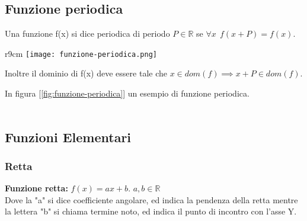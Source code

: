 \subsection{Funzione periodica}
\begin{definition}[Periodicità]
    Una funzione f(x) si dice periodica di periodo $P \in \mathbb{R}$ se $\forall x \: \: f(x + P) = f(x)$. 
\end{definition}
\begin{wrapfigure}{r}{9cm}
    \vspace{-15pt}
    \centering
    \texttt{[image: funzione-periodica.png]}
    \caption{$sin(x) = sin(x + 2\pi)$}
    \label{fig:funzione-periodica}
\end{wrapfigure}
Inoltre il dominio di f(x) deve essere tale che $x \in dom(f) \implies x + P \in dom(f)$.
\begin{example}
In figura [\ref{fig:funzione-periodica}] un esempio di funzione periodica.\\\\
\end{example}

\subsection{Funzioni Elementari}
\subsubsection{Retta}
\textbf{Funzione retta:} $f(x) = ax + b$. \hspace{.3cm} $a,b \in \mathbb{R}$ \\ Dove la "a" si dice coefficiente angolare, ed indica la pendenza della retta mentre la lettera "b" si chiama termine noto, ed indica il punto di incontro con l'asse Y.

